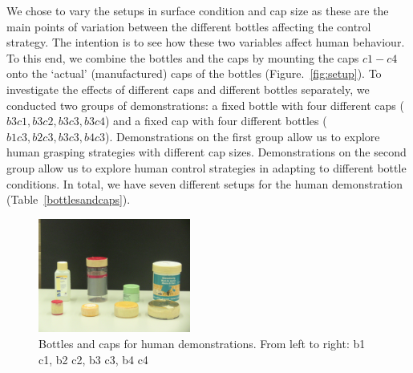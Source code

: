 
We chose to vary the setups in surface condition and cap size as these
are the main points of variation between the different bottles
affecting the control strategy. The intention is to see how these two
variables affect human behaviour. To this end, we combine the bottles
and the caps by mounting the caps $c1-c4$ onto the `actual'
(manufactured) caps of the bottles (Figure.~\ref{fig:setup}). To
investigate the effects of different caps and different bottles
separately, we conducted two groups of demonstrations: a fixed bottle with
four different caps ($b3c1, b3c2, b3c3, b3c4$) and a fixed cap with four
different bottles ($b1c3, b2c3, b3c3, b4c3$). Demonstrations on the
first group allow us to explore human grasping strategies with
different cap sizes. Demonstrations on the second group allow us to
explore human control strategies in adapting to different bottle
conditions. In total, we have seven different setups for the human
demonstration (Table~\ref{bottlesandcaps}).


\begin{figure}
  \centering
  \includegraphics[width=5cm]{./fig/b_c.jpg}
  \caption{ \scriptsize{Bottles and caps for human demonstrations. From left to right: b1 c1, b2 c2, b3 c3, b4  c4}
}
\label{fig:b_c}
\end{figure}






